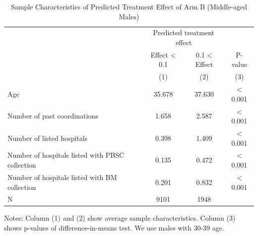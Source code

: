 \documentclass[
]{article}
\begin{document}
\begin{table}[H]

\caption{\label{tab:rcf-middle-male}Sample Characteristics of Predicted Treatment Effect of Arm B (Middle-aged Males)}
\centering
\fontsize{9}{11}\selectfont
\fontsize{9}{11}\selectfont
\begin{threeparttable}
\begin{tabular}[t]{lccc}
\toprule
\multicolumn{1}{c}{ } & \multicolumn{2}{c}{Predicted treatment effect} & \multicolumn{1}{c}{ } \\
\cmidrule(l{3pt}r{3pt}){2-3}
\multicolumn{1}{c}{ } & \multicolumn{1}{c}{Effect < 0.1} & \multicolumn{1}{c}{0.1 < Effect} & \multicolumn{1}{c}{P-value} \\
\cmidrule(l{3pt}r{3pt}){2-2} \cmidrule(l{3pt}r{3pt}){3-3} \cmidrule(l{3pt}r{3pt}){4-4}
 & (1) & (2) & (3)\\
\midrule
Age & 35.678 & 37.630 & < 0.001\\
Number of past coordinations & 1.658 & 2.587 & < 0.001\\
Number of listed hospitals & 0.398 & 1.409 & < 0.001\\
Number of hospitals listed with PBSC collection & 0.135 & 0.472 & < 0.001\\
Number of hospitals listed with BM collection & 0.201 & 0.832 & < 0.001\\
N & 9101 & 1948 & \\
\bottomrule
\end{tabular}
\begin{tablenotes}
\item Notes: Column (1) and (2) show average sample characteristics. Column (3) shows p-values of difference-in-means test. We use males with 30-39 age.
\end{tablenotes}
\end{threeparttable}
\end{table}
\end{document}
